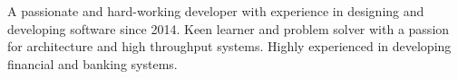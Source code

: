 

\begin{cvparagraph}

    A passionate and hard-working developer with experience in designing and developing software since 2014.
    Keen learner and problem solver with a passion for architecture and high throughput systems.
    Highly experienced in developing financial and banking systems.
\end{cvparagraph}
